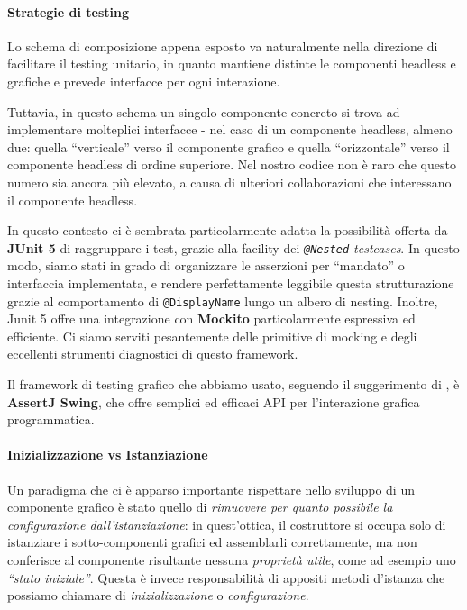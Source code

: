 \paragraph{Strategie di testing}\label{par:guiTesting}
Lo schema di composizione appena esposto va naturalmente nella direzione di facilitare il testing unitario, in quanto mantiene distinte le componenti headless e grafiche e prevede interfacce per ogni interazione.

Tuttavia, in questo schema un singolo componente concreto si trova ad implementare molteplici interfacce - nel caso di un componente headless, almeno due: quella ``verticale'' verso il componente grafico e quella ``orizzontale'' verso il componente headless di ordine superiore. Nel nostro codice non è raro che questo numero sia ancora più elevato, a causa di ulteriori collaborazioni che interessano il componente headless.

In questo contesto ci è sembrata particolarmente adatta la possibilità offerta da \textbf{JUnit 5} di raggruppare i test, grazie alla facility dei \emph{\texttt{@Nested} testcases}. In questo modo, siamo stati in grado di organizzare le asserzioni per ``mandato'' o interfaccia implementata, e rendere perfettamente leggibile questa strutturazione grazie al comportamento di \texttt{@DisplayName} lungo un albero di nesting.
Inoltre, Junit 5 offre una integrazione con \textbf{Mockito} particolarmente espressiva ed efficiente. Ci siamo serviti pesantemente delle primitive di mocking e degli eccellenti strumenti diagnostici di questo framework.

Il framework di testing grafico che abbiamo usato, seguendo il suggerimento di \cite{bettini2019tdd}, è \textbf{AssertJ Swing}, che offre semplici ed efficaci API per l'interazione grafica programmatica.


\paragraph{Inizializzazione vs Istanziazione}\label{par:initVsInst}
Un paradigma che ci è apparso importante rispettare nello sviluppo di un componente grafico è stato quello di \emph{rimuovere per quanto possibile la configurazione dall'istanziazione}: in quest'ottica, il costruttore si occupa solo di istanziare i sotto-componenti grafici ed assemblarli correttamente, ma non conferisce al componente risultante nessuna \emph{proprietà utile}, come ad esempio uno \emph{``stato iniziale''}. Questa è invece responsabilità di appositi metodi d'istanza che possiamo chiamare di \emph{inizializzazione} o \emph{configurazione}.

